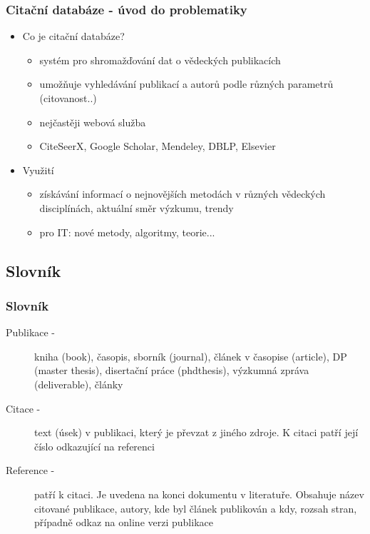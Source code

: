 \documentclass{beamer}
\begin{document}
\begin{frame}
  \frametitle{Citační databáze - úvod do problematiky}
  \begin{itemize}
    \item Co je citační databáze?
      \begin{itemize}
        \item systém pro shromažďování dat o vědeckých publikacích
        \item umožňuje vyhledávání publikací a autorů podle různých parametrů (citovanost..)
        \item nejčastěji webová služba
        \item CiteSeerX, Google Scholar, Mendeley, DBLP, Elsevier
      \end{itemize}
    \item Využití
      \begin{itemize}
        \item získávání informací o nejnovějších metodách v různých vědeckých disciplínách, aktuální směr výzkumu, trendy
        \item pro IT: nové metody, algoritmy, teorie...
      \end{itemize}
  \end{itemize}
\end{frame}

\subsection{Slovník}
\begin{frame}
  \frametitle{Slovník}
  \begin{description}
    \item[Publikace -] {kniha (book), časopis, sborník (journal), článek v časopise (article), 
                        DP (master thesis), disertační práce (phdthesis), výzkumná zpráva 
                        (deliverable), články}
    \item[Citace -]    {text (úsek) v publikaci, který je převzat z jiného zdroje. K citaci
                        patří její číslo odkazující na referenci}
    \item[Reference -] {patří k citaci. Je uvedena na konci dokumentu v literatuře.
                        Obsahuje název citované publikace, autory, kde byl
                        článek publikován a kdy, rozsah stran, případně odkaz na online
                        verzi publikace}
  \end{description}
\end{frame}
\end{document}
